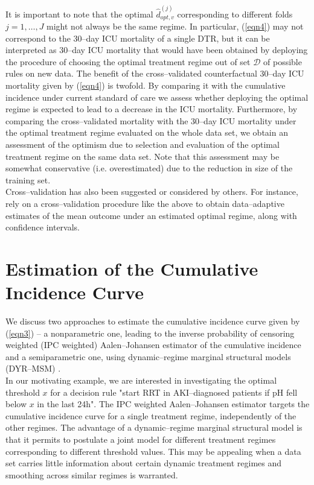 \documentclass[12pt]{article}
\begin{document}
It is important to note that the optimal $\hat{d}_{opt, v}^{(j)}$ corresponding to different folds $j = 1, \dots, J$ might not always be the same regime. In particular, (\ref{eqn4}) may not correspond to the $30$--day ICU mortality of a single DTR,  but it can be interpreted as $30$--day ICU mortality that would have been obtained by deploying the procedure of choosing the optimal treatment regime out of set $\mathcal{D}$ of possible rules on new data. The benefit of the cross--validated counterfactual $30$--day ICU mortality given by (\ref{eqn4}) is twofold. By comparing it with the cumulative incidence under current standard of care we assess whether deploying the optimal regime is expected to lead to a decrease in the ICU mortality. Furthermore, by comparing the cross--validated mortality with the $30$--day ICU mortality under the optimal treatment regime evaluated on the whole data set, we obtain an assessment of the optimism due to selection and evaluation of the optimal treatment regime on the same data set.  Note that this assessment may be somewhat conservative (i.e. overestimated) due to the reduction in size of the training set.
\\
\indent
Cross--validation has also been suggested \citep{Chakraborty2014} or considered \citep{Luedtke2018} by others. For instance, \cite{Luedtke2018} rely on a cross--validation procedure like the above to obtain data--adaptive estimates of the mean outcome under an estimated optimal regime, along with confidence intervals.  

\section{Estimation of the Cumulative Incidence Curve}\label{sec4}

We discuss two approaches to estimate the cumulative incidence curve given by (\ref{eqn3}) -- a nonparametric one, leading to the inverse probability of censoring weighted (IPC weighted) Aalen--Johansen estimator of the cumulative incidence \citep{Aalen1978, Young2020} and a semiparametric one, using dynamic--regime marginal structural models (DYR--MSM) \citep{Murphy2001, VanderLaan2007, Orellana2010}. 
\\
\indent
In our motivating example, we are interested in investigating the optimal threshold $x$ for a decision rule "start RRT in AKI--diagnosed patients if pH fell below $x$ in the last 24h". The IPC weighted Aalen--Johansen estimator targets the cumulative incidence curve for a single treatment regime, independently of the other regimes. The advantage of a dynamic--regime marginal structural model is that it permits to postulate a joint model for different treatment regimes corresponding to different threshold values.  This may be appealing when a data set carries little information about certain dynamic treatment regimes and smoothing across similar regimes is warranted. 
\end{document}
